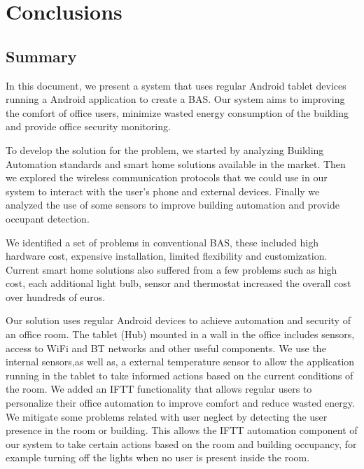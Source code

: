 \chapter{Conclusions}
\label{chapter:conclusion}

\section{Summary}
\label{section:summary}


In this document, we present a system that uses regular Android tablet devices running a Android application to create a \ac{BAS}. Our system aims to improving the comfort of office users, minimize wasted energy consumption of the building and provide office security monitoring. 

To develop the solution for the problem, we started by analyzing Building Automation standards and smart home solutions available in the market. Then we explored the wireless communication protocols that we could use in our system to interact with the user's phone and external devices. Finally we analyzed the use of some sensors to improve building automation and provide occupant detection. 

We identified a set of problems in conventional \ac{BAS}, these included high hardware cost, expensive installation, limited flexibility and customization.
Current smart home solutions also suffered from a few problems such as high cost, each additional light bulb, sensor and thermostat increased the overall cost over hundreds of euros.

Our solution uses regular Android devices to achieve automation and security of an office room. The tablet (Hub) mounted in a wall in the office includes sensors, access to \ac{WiFi} and \ac{BT} networks and other useful components. We use the internal sensors,as well as, a external temperature sensor to allow the application running in the tablet to take informed actions based on the current conditions of the room. 
We added an \ac{IFTT} functionality that allows regular users to personalize their office automation to improve comfort and reduce wasted energy. We mitigate some problems related with user neglect by detecting the user presence in the room or building. This allows the \ac{IFTT} automation component of our system to take certain actions based on the room and building occupancy, for example turning off the lights when no user is present inside the room.


